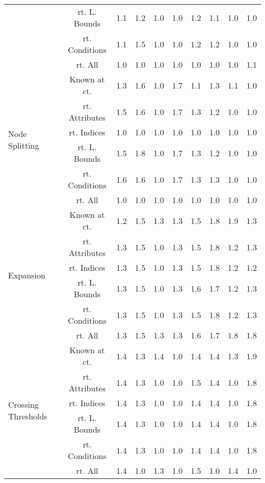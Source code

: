 \documentclass{article}
\begin{document}
\begin{longtable}{|p{2cm}||c|c|c|c|c|c|c|c|c|}
 & rt. L. Bounds & 1.1 & 1.2 & 1.0 & 1.0 & 1.2 & 1.1 & 1.0 & 1.0\\ \cline{2-10}
 & rt. Conditions & 1.1 & 1.5 & 1.0 & 1.0 & 1.2 & 1.2 & 1.0 & 1.0\\ \cline{2-10}
 & rt. All & 1.0 & 1.0 & 1.0 & 1.0 & 1.0 & 1.0 & 1.0 & 1.1\\ \cline{2-10}
\hline
\multirow{6}{*}{ \parbox{2cm}{Node Splitting}} & Known at ct. & 1.3 & 1.6 & 1.0 & 1.7 & 1.1 & 1.3 & 1.1 & 1.0\\ \cline{2-10}
 & rt. Attributes & 1.5 & 1.6 & 1.0 & 1.7 & 1.3 & 1.2 & 1.0 & 1.0\\ \cline{2-10}
 & rt. Indices & 1.0 & 1.0 & 1.0 & 1.0 & 1.0 & 1.0 & 1.0 & 1.0\\ \cline{2-10}
 & rt. L. Bounds & 1.5 & 1.8 & 1.0 & 1.7 & 1.3 & 1.2 & 1.0 & 1.0\\ \cline{2-10}
 & rt. Conditions & 1.6 & 1.6 & 1.0 & 1.7 & 1.3 & 1.3 & 1.0 & 1.0\\ \cline{2-10}
 & rt. All & 1.0 & 1.0 & 1.0 & 1.0 & 1.0 & 1.0 & 1.0 & 1.0\\ \cline{2-10}
\hline
\multirow{6}{*}{ \parbox{2cm}{Expansion}} & Known at ct. & 1.2 & 1.5 & 1.3 & 1.3 & 1.5 & 1.8 & 1.9 & 1.3\\ \cline{2-10}
 & rt. Attributes & 1.3 & 1.5 & 1.0 & 1.3 & 1.5 & 1.8 & 1.2 & 1.3\\ \cline{2-10}
 & rt. Indices & 1.3 & 1.5 & 1.0 & 1.3 & 1.5 & 1.8 & 1.2 & 1.2\\ \cline{2-10}
 & rt. L. Bounds & 1.3 & 1.5 & 1.0 & 1.3 & 1.6 & 1.7 & 1.2 & 1.3\\ \cline{2-10}
 & rt. Conditions & 1.3 & 1.5 & 1.0 & 1.3 & 1.5 & 1.8 & 1.2 & 1.3\\ \cline{2-10}
 & rt. All & 1.3 & 1.5 & 1.3 & 1.3 & 1.6 & 1.7 & 1.8 & 1.8\\ \cline{2-10}
\hline
\multirow{6}{*}{ \parbox{2cm}{Crossing Thresholds}} & Known at ct. & 1.4 & 1.3 & 1.4 & 1.0 & 1.4 & 1.4 & 1.3 & 1.9\\ \cline{2-10}
 & rt. Attributes & 1.4 & 1.3 & 1.0 & 1.0 & 1.5 & 1.4 & 1.0 & 1.8\\ \cline{2-10}
 & rt. Indices & 1.4 & 1.3 & 1.0 & 1.0 & 1.4 & 1.4 & 1.0 & 1.8\\ \cline{2-10}
 & rt. L. Bounds & 1.4 & 1.3 & 1.0 & 1.0 & 1.4 & 1.4 & 1.0 & 1.8\\ \cline{2-10}
 & rt. Conditions & 1.4 & 1.3 & 1.0 & 1.0 & 1.4 & 1.4 & 1.0 & 1.8\\ \cline{2-10}
 & rt. All & 1.4 & 1.0 & 1.3 & 1.0 & 1.5 & 1.0 & 1.4 & 1.0\\ \cline{2-10}

\end{longtable}
\end{document}
